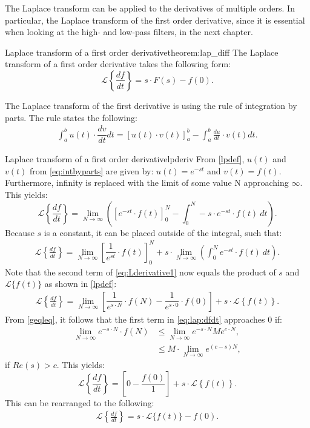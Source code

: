 \noindent The Laplace transform can be applied to the derivatives of multiple orders. In particular, the Laplace transform of the first order derivative, since it is essential when looking at the high- and low-pass filters, in the next chapter.
\\
\begin{theorem}{Laplace transform of a first order derivative}{theorem:lap_diff}
The Laplace transform of a first order derivative takes the following form: \cite[p. 332]{diffandcomplex}
$$\mathcal{L} \left\{\frac{df}{dt} \right\} = s \cdot F(s)-f(0).$$
\end{theorem}
\noindent The Laplace transform of the first derivative is using the rule of integration by parts. The rule states the following:
\begin{align}
\int_{a}^{b}{u(t) \cdot \dfrac{dv}{dt}dt}=\left[u(t) \cdot v(t) \right]_{a}^{b}-\int_{a}^{b} \frac{du}{dt}\cdot v(t) dt.
\label{eq:intbyparts}
\end{align}
\begin{prof}{Laplace transform of a first order derivative}{lpderiv}
From \cref{lpdef}, $u(t)$ and $v(t)$ from \eqref{eq:intbyparts} are given by: $u(t) = e^{-st}$ and $v(t) = f(t)$. Furthermore, infinity is replaced with the limit of some value N approaching $\infty$. This yields:
$$\mathcal{L} \left\{\frac{df}{dt} \right\}=\lim_{N \to \infty} \left(\left[e^{-st}\cdot f(t)\right]_{0}^{N}-\int_{0}^{N} -s\cdot e^{-st}\cdot f(t)\ dt \right).$$
Because $s$ is a constant, it can be placed outside of the integral, such that:
\begin{align}
\mathcal{L} \left\{\frac{df}{dt} \right\}=\lim_{N \to \infty} \left[\dfrac{1}{e^{st}}\cdot f(t)\right]_{0}^{N}+ s \cdot \lim_{N \to \infty} \left( \int_{0}^{N}e^{-st}\cdot f(t)\ dt \right).\label{eq:Lderivative1}
\end{align}
Note that the second term of \eqref{eq:Lderivative1} now equals the product of $s$ and $\mathcal{L}\{f(t)\}$ as shown in \cref{lpdef}:
\begin{align}
\mathcal{L} \left\{\frac{df}{dt} \right\} = \lim_{N \to \infty}\left[\dfrac{1}{e^{s\cdot N}}\cdot f(N)-\dfrac{1}{e^{s\cdot 0}}\cdot f(0)\right]+s\cdot \mathcal{L} \left\{f(t) \right\}. \label{eq:lap:dfdt}
\end{align}
From \cref{geqleq}, it follows that the first term in \eqref{eq:lap:dfdt} approaches $0$ if:
\begin{align*}
\lim_{N \to \infty} e^{-s\cdot N}\cdot f(N) &\leq \lim_{N \to \infty} e^{-s\cdot N} Me^{c\cdot N},\\
&\leq M \cdot \lim_{N \to \infty} e^{(c-s)N},
\end{align*}
if $Re(s) > c$. This yields:
$$\mathcal{L} \left\{\frac{df}{dt} \right\} = \left[0-\dfrac{f(0)}{1}\right]+s\cdot \mathcal{L} \left\{f(t) \right\}.$$
This can be rearranged to the following:
\begin{align*}
\mathcal{L} \left\{\frac{df}{dt} \right\} = s\cdot \mathcal{L}\{f(t)\}-f(0).
\end{align*}

\end{prof}
